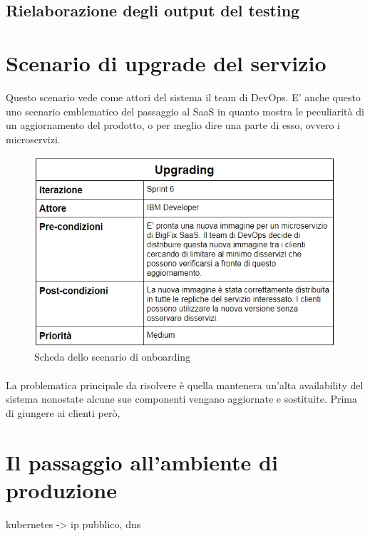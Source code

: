 \subsection{Rielaborazione degli output del testing}

\section{Scenario di upgrade del servizio}
Questo scenario vede come attori del sistema il team di DevOps. E' anche questo uno scenario emblematico del passaggio al SaaS in quanto mostra le peculiarità di un aggiornamento del prodotto, o per meglio dire una parte di esso, ovvero i microservizi.
\begin{figure}[h]
	\centering
	\includegraphics[width=0.7\linewidth]{capitoli/imgs/upgradescenarioScheda}
	\caption{Scheda dello scenario di onboarding}
	\label{fig:upgradescenarioscheda}
\end{figure}
\paragraph{}
La problematica principale da risolvere è quella mantenera un'alta availability del sistema nonostate alcune sue componenti vengano aggiornate e sostituite. Prima di giungere ai clienti però, 

\section{Il passaggio all'ambiente di produzione}
kubernetes -> ip pubblico, dns


